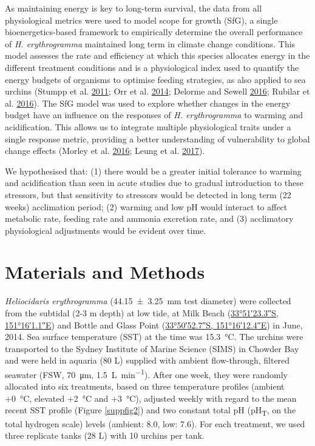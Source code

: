 \documentclass[a4paper,10pt, oneside]{memoir}
\begin{document}
As maintaining energy is key to long-term survival, the data from all physiological metrics were used to model scope for growth (SfG), a single bioenergetics-based framework to empirically determine the overall performance of \textit{H. erythrogramma} maintained long term in climate change conditions.
This model assesses the rate and efficiency at which this species allocates energy in the different treatment conditions and is a physiological index used to quantify the energy budgets of organisms to optimise feeding strategies, as also applied to sea urchins (Stumpp et al. \protect\hyperlink{ref-Stumpp2011}{2011}; Orr et al. \protect\hyperlink{ref-Orr2014}{2014}; Delorme and Sewell \protect\hyperlink{ref-Delorme2016}{2016}; Rubilar et al. \protect\hyperlink{ref-Rubilar2016}{2016}).
The SfG model was used to explore whether changes in the energy budget have an influence on the responses of \textit{H. erythrogramma} to warming and acidification.
This allows us to integrate multiple physiological traits under a single response metric, providing a better understanding of vulnerability to global change effects (Morley et al. \protect\hyperlink{ref-Morley2016}{2016}; Leung et al. \protect\hyperlink{ref-Leung2017}{2017}).

We hypothesised that:
(1) there would be a greater initial tolerance to warming and acidification than seen in acute studies due to gradual introduction to these stressors, but that sensitivity to stressors would be detected in long term (22 weeks) acclimation period;
(2) warming and low pH would interact to affect metabolic rate, feeding rate and ammonia excretion rate, and
(3) acclimatory physiological adjustments would be evident over time.

\hypertarget{materials-and-methods-1}{%
\section{Materials and Methods}\label{materials-and-methods-1}}

\textit{Heliocidaris erythrogramma} (\SI{44.15(325)}{\mm} test diameter) were collected from the subtidal (2-3 m depth) at low tide, at Milk Beach (\href{https://www.google.com/maps/?q=-33.856478,151.266958}{\ang{33;51;23.3}S, \ang{151;16;1.1}E}) and Bottle and Glass Point (\href{https://www.google.com/maps/?q=-33.847960,151.270122}{\ang{33;50;52.7}S, \ang{151;16;12.4}E}) in June, 2014. Sea surface temperature (SST) at the time was \SI{15.3}{\celsius}.
The urchins were transported to the Sydney Institute of Marine Science (SIMS) in Chowder Bay and were held in aquaria (80 L) supplied with ambient flow-through, filtered seawater (FSW, \SI{70}{\micro\m}, \SI{1.5}{L.min^{-1}}).
After one week, they were randomly allocated into six treatments, based on three temperature profiles (ambient +\SI{0}{\celsius}, elevated +\SI{2}{\celsius} and +\SI{3}{\celsius}), adjusted weekly with regard to the mean recent SST profile (Figure \ref{suppfig2}) and two constant total pH (pH\textsubscript{T}, on the total hydrogen scale) levels (ambient: 8.0, low: 7.6). For each treatment, we used three replicate tanks (28 L) with 10 urchins per tank.
\end{document}
